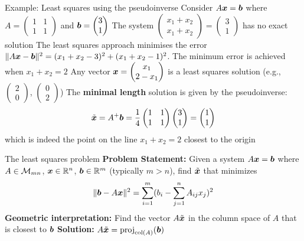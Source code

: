 \documentclass[aspectratio=169]{beamer}\usepackage[]{graphicx}\usepackage[]{xcolor}
\begin{document}
\begin{frame}{Example: Least squares using the pseudoinverse}
Consider $A\bm{x} = \bm{b}$ where $A = \begin{pmatrix} 1 & 1 \\ 1 & 1 \end{pmatrix}$ and $\bm{b} = \begin{pmatrix} 3 \\ 1 \end{pmatrix}$
\vfill
The system $\begin{pmatrix} x_1+x_2 \\ x_1+x_2 \end{pmatrix} = \begin{pmatrix} 3 \\ 1 \end{pmatrix}$ has no exact solution
\vfill
The least squares approach minimises the error $\|A\bm{x}-\bm{b}\|^2 = (x_1+x_2-3)^2 + (x_1+x_2-1)^2$. The minimum error is achieved when $x_1+x_2 = 2$
\vfill
Any vector $\bm{x} = \begin{pmatrix} x_1 \\ 2-x_1 \end{pmatrix}$ is a least squares solution (e.g., $\begin{pmatrix} 2 \\ 0 \end{pmatrix}$, $\begin{pmatrix} 0 \\ 2 \end{pmatrix}$)
\vfill
The \textbf{minimal length} solution is given by the pseudoinverse:
\[
\tilde{\bm{x}} = A^+\bm{b} = \frac{1}{4}\begin{pmatrix} 1 & 1 \\ 1 & 1 \end{pmatrix}\begin{pmatrix} 3 \\ 1 \end{pmatrix} = \begin{pmatrix} 1 \\ 1 \end{pmatrix}
\]
which is indeed the point on the line $x_1+x_2=2$ closest to the origin
\end{frame}





\begin{frame}{The least squares problem}
\textbf{Problem Statement:}
\vfill
Given a system $A\bm{x} = \bm{b}$ where $A\in\mathcal{M}_{mn}$, $\bm{x}\in\mathbb{R}^n$, $\bm{b}\in\mathbb{R}^m$ (typically $m>n$), find $\tilde{\bm{x}}$ that minimizes
$$
\|\bm{b} - A\bm{x}\|^2 = \sum_{i=1}^m (b_i - \sum_{j=1}^n A_{ij}x_j)^2
$$
\vfill
\textbf{Geometric interpretation:}
Find the vector $A\tilde{\bm{x}}$ in the column space of $A$ that is closest to $\bm{b}$
\vfill
\textbf{Solution:} $A\tilde{\bm{x}} = \text{proj}_{\text{col}(A)}(\bm{b})$
\end{frame}
\end{document}
